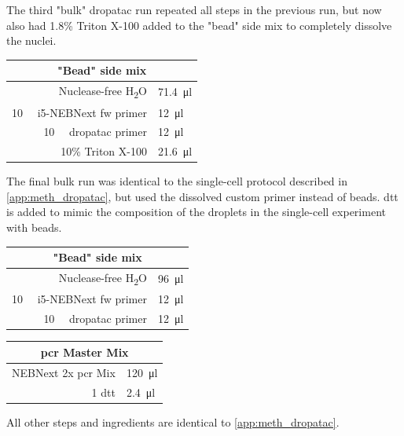 \begin{appendix}
\begin{multicols}{2}
The third "bulk" \acrshort{dropatac} run repeated all steps in the previous run, but now also had 1.8\% Triton X-100 added to the "bead" side mix to completely dissolve the nuclei.\pms

\begin{center}
\begin{tabular}{r|l}
	\multicolumn{2}{c}{"Bead" side mix} \\
	\hline
	Nuclease-free H\textsubscript{2}O & \SI{71.4}{\ul} \\
	\SI{10}{\micro\molar} i5-NEBNext fw primer & \SI{12}{\ul} \\
	\SI{10}{\micro\molar} \acrshort{dropatac} primer & \SI{12}{\ul} \\
	10\% Triton X-100 & \SI{21.6}{\ul} \\
\end{tabular}
\end{center}
\medskip

The final bulk run was identical to the single-cell protocol described in \ref{app:meth_dropatac}, but used the dissolved custom primer instead of beads. \acrshort{dtt} is added to mimic the composition of the droplets in the single-cell experiment with beads.\pms

\begin{center}
\begin{tabular}{r|l}
	\multicolumn{2}{c}{"Bead" side mix} \\
	\hline
	Nuclease-free H\textsubscript{2}O & \SI{96}{\ul} \\
	\SI{10}{\micro\molar} i5-NEBNext fw primer & \SI{12}{\ul} \\
	\SI{10}{\micro\molar} \acrshort{dropatac} primer & \SI{12}{\ul} \\
\end{tabular}
\end{center}
\medskip

\begin{center}
\begin{tabular}{r|l}
	\multicolumn{2}{c}{\acrshort{pcr} Master Mix} \\
	\hline
	NEBNext 2x \acrshort{pcr} Mix & \SI{120}{\ul} \\
	\SI{1}{\molar} \acrshort{dtt} & \SI{2.4}{\ul} \\
\end{tabular}
\end{center}
\medskip

All other steps and ingredients are identical to \ref{app:meth_dropatac}.\pms


\end{multicols}
\end{appendix}

